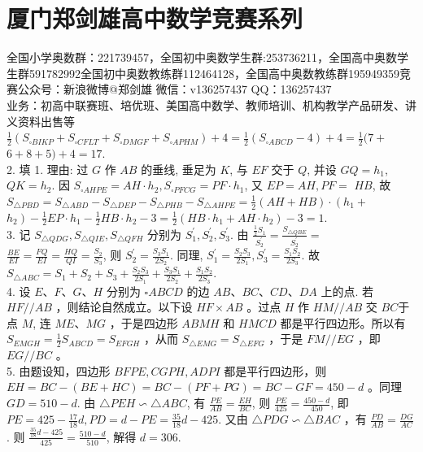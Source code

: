 \documentclass[10pt]{article}
\begin{document}
\section*{厦门郑剑雄高中数学竞赛系列}
全国小学奥数群：221739457，全国初中奥数学生群:253736211，全国高中奥数学生群591782992全国初中奥数教练群112464128，全国高中奥数教练群195949359竞赛公众号：新浪微博@郑剑雄 微信：v136257437 QQ：136257437\\
业务：初高中联赛班、培优班、美国高中数学、教师培训、机构教学产品研发、讲义资料出售等\\
$\frac{1}{2}\left(S_{\square B I K P}+S_{\square C F L T}+S_{\square D M G F}+S_{\square A P H M}\right)+4=\frac{1}{2}\left(S_{\square A B C D}-4\right)+4=\frac{1}{2}(7+$ $6+8+5)+4=17$.\\
2. 填 1. 理由: 过 $G$ 作 $A B$ 的垂线, 垂足为 $K$, 与 $E F$ 交于 $Q$, 并设 $G Q=h_{1}$, $Q K=h_{2}$. 因 $S_{\square A H P E}=A H \cdot h_{2}, S_{\square P F C G}=P F \cdot h_{1}$, 又 $E P=A H, P F=$ $H B$, 故 $S_{\triangle P B D}=S_{\triangle A B D}-S_{\triangle D E P}-S_{\triangle P H B}-S_{\triangle A H P E}=\frac{1}{2}(A H+H B) \cdot\left(h_{1}+\right.$ $\left.h_{2}\right)-\frac{1}{2} E P \cdot h_{1}-\frac{1}{2} H B \cdot h_{2}-3=\frac{1}{2}\left(H B \cdot h_{1}+A H \cdot h_{2}\right)-3=1$.\\
3. 记 $S_{\triangle Q D G}, S_{\triangle Q I E}, S_{\triangle Q F H}$ 分别为 $S_{1}^{\prime}, S_{2}^{\prime}, S_{3}^{\prime}$. 由 $\frac{\frac{1}{2} S_{1}}{S_{2}^{\prime}}=\frac{S_{\triangle Q B E}}{S_{2}^{\prime}}=$ $\frac{B E}{E I}=\frac{F Q}{E I}=\frac{H Q}{Q I}=\frac{S_{2}}{S_{3}}$, 则 $S_{2}^{\prime}=\frac{S_{3} S_{1}}{2 S_{2}}$. 同理, $S_{1}^{\prime}=\frac{S_{2} S_{3}}{2 S_{1}}, S_{3}^{\prime}=\frac{S_{1} S_{2}}{2 S_{3}}$. 故 $S_{\triangle A B C}=S_{1}+S_{2}+S_{3}+\frac{S_{2} S_{3}}{2 S_{1}}+\frac{S_{3} S_{1}}{2 S_{2}}+\frac{S_{1} S_{2}}{2 S_{3}}$.\\
4. 设 $E 、 F 、 G 、 H$ 分别为 $\square A B C D$ 的边 $A B 、 B C 、 C D 、 D A$ 上的点. 若 $H F / / A B$ ，则结论自然成立。以下设 $H F \times A B$ 。过点 $H$ 作 $H M / / A B$ 交 $B C$于点 $M$, 连 $M E 、 M G$ ，于是四边形 $A B M H$ 和 $H M C D$ 都是平行四边形。所以有 $S_{E M G H}=\frac{1}{2} S_{A B C D}=S_{E F G H}$ ，从而 $S_{\triangle E M G}=S_{\triangle E F G}$ ，于是 $F M / / E G$ ，即 $E G / / B C$ 。\\
5. 由题设知，四边形 $B F P E, C G P H, A D P I$ 都是平行四边形，则 $E H=B C-(B E+H C)=B C-(P F+P G)=B C-G F=450-d$ 。同理 $G D=510-d$. 由 $\triangle P E H \backsim \triangle A B C$, 有 $\frac{P E}{A B}=\frac{E H}{B C}$, 则 $\frac{P E}{425}=\frac{450-d}{450}$, 即 $P E=425-\frac{17}{18} d, P D=d-P E=\frac{35}{18} d-425$. 又由 $\triangle P D G \backsim \triangle B A C$ ，有 $\frac{P D}{A B}=\frac{D G}{A C}$. 则 $\frac{\frac{35}{18} d-425}{425}=\frac{510-d}{510}$, 解得 $d=306$.\\
\end{document}
